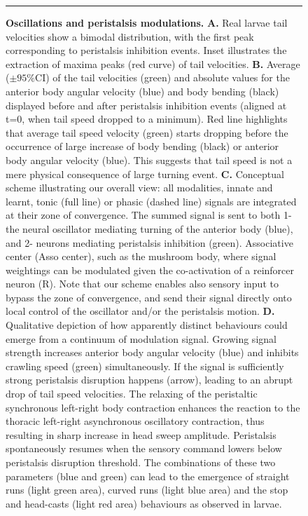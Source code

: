\documentclass[11pt,a4paper]{article}
\begin{document}
\begin{figure}
\begin{center}
\caption{{\bf Oscillations and peristalsis modulations.} {\bf A.} Real larvae tail velocities show a bimodal distribution, with the first peak corresponding to peristalsis inhibition events. Inset illustrates the extraction of maxima peaks (red curve) of tail velocities.
{\bf B.} Average ($\pm 95\%$CI) of the tail velocities (green) and absolute values for the anterior body angular velocity (blue) and body bending (black) displayed before and after peristalsis inhibition events (aligned at t=0, when tail speed dropped to a minimum). Red line highlights that average tail speed velocity (green) starts dropping before the occurrence of large increase of body bending (black) or anterior body angular velocity (blue). This suggests that tail speed is not a mere physical consequence of large turning event.
{\bf C.} Conceptual scheme illustrating our overall view: all modalities, innate and learnt, tonic (full line) or phasic (dashed line) signals are integrated at their zone of convergence. The summed signal is sent to both 1-the  neural oscillator mediating turning of the anterior body (blue), and 2- neurons mediating peristalsis inhibition (green).  Associative center (Asso center), such as the mushroom body, where signal weightings can be modulated given the co-activation of a reinforcer neuron (R). Note that our scheme enables also sensory input to bypass the zone of convergence, and send their signal directly onto local control of the oscillator and/or the peristalsis motion.  
{\bf D.} Qualitative depiction of how apparently distinct behaviours could emerge from a continuum of modulation signal. Growing signal strength increases anterior body angular velocity (blue) and inhibits crawling speed (green) simultaneously. If the signal is sufficiently strong peristalsis disruption happens (arrow), leading to an abrupt drop of tail speed velocities. The relaxing of the peristaltic synchronous left-right body contraction enhances the reaction to the thoracic left-right asynchronous oscillatory contraction, thus resulting in sharp increase in head sweep amplitude. Peristalsis spontaneously resumes when the sensory command lowers below peristalsis disruption threshold. The combinations of these two parameters (blue and green) can lead to the emergence of straight runs (light green area), curved runs (light blue area) and the stop and head-casts (light red area) behaviours as observed in larvae.
\label{fig:Peristalsis}}
\hrule
\end{center}
\end{figure}
\end{document}

